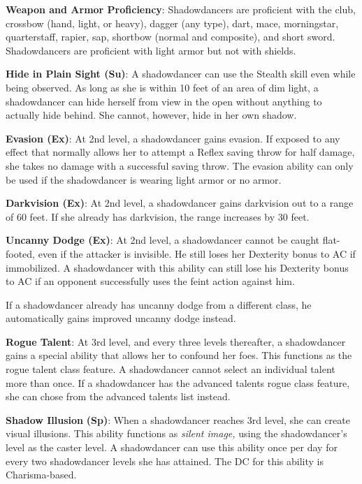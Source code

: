 \textbf{Weapon and Armor Proficiency}: Shadowdancers are proficient with the club, crossbow (hand, light, or heavy), dagger (any type), dart, mace, morningstar, quarterstaff, rapier, sap, shortbow (normal and composite), and short sword. Shadowdancers are proficient with light armor but not with shields.
				
\textbf{Hide in Plain Sight (Su)}: A shadowdancer can use the Stealth skill even while being observed. As long as she is within 10 feet of an area of dim light, a shadowdancer can hide herself from view in the open without anything to actually hide behind. She cannot, however, hide in her own shadow.
				
\textbf{Evasion (Ex)}: At 2nd level, a shadowdancer gains evasion. If exposed to any effect that normally allows her to attempt a Reflex saving throw for half damage, she takes no damage with a successful saving throw. The evasion ability can only be used if the shadowdancer is wearing light armor or no armor.
				
\textbf{Darkvision (Ex)}: At 2nd level, a shadowdancer gains darkvision out to a range of 60 feet. If she already has darkvision, the range increases by 30 feet.
				
\textbf{Uncanny Dodge (Ex)}: At 2nd level, a shadowdancer cannot be caught flat-footed, even if the attacker is invisible. He still loses her Dexterity bonus to AC if immobilized. A shadowdancer with this ability can still lose his Dexterity bonus to AC if an opponent successfully uses the feint action against him.
				
If a shadowdancer already has uncanny dodge from a different class, he automatically gains improved uncanny dodge instead.
				
\textbf{Rogue Talent}: At 3rd level, and every three levels thereafter, a shadowdancer gains a special ability that allows her to confound her foes. This functions as the rogue talent class feature. A shadowdancer cannot select an individual talent more than once. If a shadowdancer has the advanced talents rogue class feature, she can chose from the advanced talents list instead.
				
\textbf{Shadow Illusion} \textbf{(Sp)}: When a shadowdancer reaches 3rd level, she can create visual illusions. This ability functions as \textit{silent image,} using the shadowdancer's level as the caster level. A shadowdancer can use this ability once per day for every two shadowdancer levels she has attained. The DC for this ability is Charisma-based.
				
